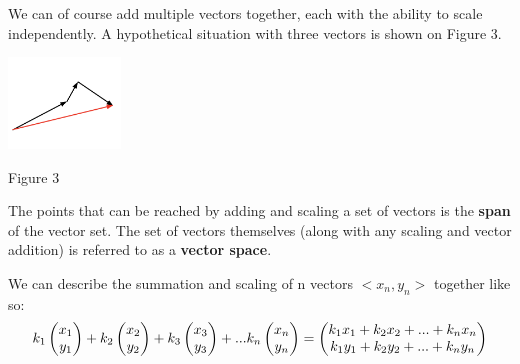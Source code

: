 \documentclass{article}
\begin{document}
\linebreak
\linebreak
\linebreak
\begin{minipage}[c]{.5\linewidth}
	\par \noindent We can of course add multiple vectors together, each with the ability to scale independently. A hypothetical situation with three vectors is shown on Figure 3.
\end{minipage}%
\begin{minipage}[c]{.5\linewidth}
\begin{center}
	\includegraphics[width=3cm]{matrix-scaling-3.png}
\end{center}
\begin{center}
	Figure 3
\end{center}
\end{minipage}
\newline
\newline
\newline
\par\noindent The points that can be reached by adding and scaling a set of vectors is the \textbf{span} of the vector set. The set of vectors themselves (along with any scaling and vector addition) is referred to as a \textbf{vector space}.
\newpage
\par \noindent We can describe the summation and scaling of n vectors \(<x_n, y_n>\) together like so:
\newline
\[
k_1
\left(\begin{array}{@{}c@{}}
	x_1 \\
	y_1 \\
\end{array}\right) + 
k_2
\left(\begin{array}{@{}c@{}}
	x_2 \\
	y_2 \\
\end{array}\right) + 
k_3
\left(\begin{array}{@{}c@{}}
	x_3 \\
	y_3 \\
\end{array}\right) + 
... 
k_n
\left(\begin{array}{@{}c@{}}
	x_n \\
	y_n \\
\end{array}\right) =
\left(\begin{array}{@{}c@{}}
	k_1 x_1 + k_2 x_2 + ... + k_n x_n \\
	k_1 y_1 + k_2 y_2 + ... + k_n y_n \\
\end{array}\right) 
\]
\end{document}
